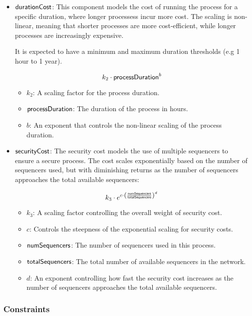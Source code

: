 \begin{itemize}
	\item ${\sf{durationCost}}$: This component models the cost of running the process for a specific duration, where longer processess incur more cost. The scaling is non-linear, meaning that shorter processes are more cost-efficient, while longer processes are increasingly expensive.
	
	It is expected to have a minimum and maximum duration thresholds (e.g 1 hour to 1 year).
	
	$$ k_2 \cdot {\sf{processDuration}}^b $$
	
	\begin{itemize}
		\item $k_2$: A scaling factor for the process duration.
		\item ${\sf{processDuration}}$: The duration of the process in hours.
		\item $b$: An exponent that controls the non-linear scaling of the process duration.
	\end{itemize}
	
	\item ${\sf{securityCost}}$: The security cost models the use of multiple sequencers to ensure a secure process. The cost scales exponentially based on the number of sequencers used, but with diminishing returns as the number of sequencers approaches the total available sequencers:
	
	$$ k_3 \cdot e^{c \cdot \left( \frac{{\sf{numSequencers}}}{{\sf{totalSequencers}}} \right)^d} $$
	
	\begin{itemize}
		\item $k_3$: A scaling factor controlling the overall weight of security cost.
		\item $c$: Controls the steepness of the exponential scaling for security costs.
		\item ${\sf{numSequencers}}$: The number of sequencers used in this process.
		\item ${\sf{totalSequencers}}$: The total number of available sequencers in the network.
		\item $d$: An exponent controlling how fast the security cost increases as the number of sequencers approaches the total available sequencers.
	\end{itemize}
\end{itemize}

\subsubsection{Constraints}

